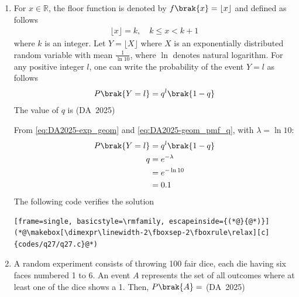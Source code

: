 \begin{enumerate}[label=\thesubsection.\arabic*, ref=\thesubsection.\theenumi]
\begin{figure}[H]
	\label{fig:DA-2025-40}
\end{figure}
	\item 
	For $x \in \mathbb{R}$, the floor function is denoted by $f\brak{x} = \lfloor x \rfloor$ and defined as follows
	\begin{align}
		\lfloor x \rfloor = k, \quad k \le x < k + 1
	\end{align}
	where $k$ is an integer. Let $Y = \lfloor X \rfloor$ where $X$ is an exponentially distributed random variable with mean $\frac{1}{\ln 10}$, where $\ln$ denotes natural logarithm. For any positive integer $l$, one can write the probability of the event $Y = l$ as follows
	\begin{align}
		P\brak{Y = l} = q^l\brak{1 - q}
	\end{align}
	The value of $q$ is
	\hfill (DA~2025)
	\begin{enumerate}
	\end{enumerate}
	\solution
	From \eqref{eq:DA2025-exp_geom} and \eqref{eq:DA2025-geom_pmf_q}, with $\lambda = \ln 10$:
	\begin{align}
		P\brak{Y = l} &= q^l\brak{1 - q}
		\\
		q &= e^{-\lambda}
		\\
		&= e^{-\ln 10}
		\\
		&= 0.1
	\end{align}
	The following code verifies the solution 
	\begin{lstlisting}[frame=single, basicstyle=\rmfamily, escapeinside={(*@}{@*)}]
(*@\makebox[\dimexpr\linewidth-2\fboxsep-2\fboxrule\relax][c]{codes/q27/q27.c}@*)
	\end{lstlisting}
	\item 
	A random experiment consists of throwing 100 fair dice, each die having six faces numbered 1 to 6. An event $A$ represents the set of all outcomes where at least one of the dice shows a 1. Then, $P\brak{A} = $
	\hfill (DA~2025)
	\begin{enumerate}
		\begin{multicols}{4}
			\item $0$
			\item $1$
			\item $1 - \brak{\frac{5}{6}}^{100}$

\end{multicols}
\end{enumerate}
\end{enumerate}
